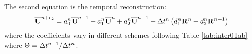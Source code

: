 \documentclass[preprint,12pt]{elsarticle}
\begin{document}
The second equation is the temporal reconstruction:
\begin{equation}
    \label{eq:TRSum}
    \overline{\mathbf{U}}^{n+c_2}  =
    a^n_0\overline{\mathbf{U}}^{n - 1} +
    a^n_1\overline{\mathbf{U}}^{n} +
    a^n_2\overline{\mathbf{U}}^{n + 1}
    +
    \mathrm\Delta t^n
    \left(
    d^n_1\mathbf{R}^{n} +
    d^n_2\mathbf{R}^{n + 1}
    \right)
\end{equation}
where the coefficients vary in different schemes
following Table \ref{tab:inter0Tab} where
$\Theta = \mathrm\Delta t^{n-1} / \mathrm\Delta t^{n}$.
\end{document}

